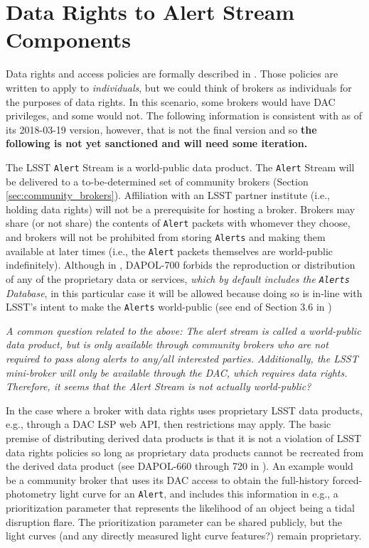 \section{Data Rights to Alert Stream Components}\label{sec:data_rights}



Data rights and access policies are formally described in .
Those policies are written to apply to {\em individuals}, but we could think of brokers as individuals for the purposes of data rights.
In this scenario, some brokers would have DAC privileges, and some would not.
The following information is consistent with  as of its 2018-03-19 version, however, that is not the final version and so {\bf the following is not yet sanctioned and will need some iteration.}

The LSST {\tt Alert} Stream is a world-public data product.
The {\tt Alert} Stream will be delivered to a to-be-determined set of community brokers (Section \ref{sec:community_brokers}).
Affiliation with an LSST partner institute (i.e., holding data rights) will not be a prerequisite for hosting a broker.
Brokers may share (or not share) the contents of {\tt Alert} packets with whomever they choose, and brokers will not be prohibited from storing {\tt Alerts} and making them available at later times (i.e., the {\tt Alert} packets themselves are world-public indefinitely).
Although in , DAPOL-700 forbids the reproduction or distribution of any of the proprietary data or services, {\em which by default includes the {\tt Alerts} Database}, in this particular case it will be allowed because doing so is in-line with LSST's intent to make the {\tt Alerts} world-public (see end of Section 3.6 in )

{\it A common question related to the above: The alert stream is called a world-public data product, but is only available through community brokers who are not required to pass along alerts to any/all interested parties.
Additionally, the LSST mini-broker will only be available through the DAC, which requires data rights.
Therefore, it seems that the Alert Stream is not actually world-public?}

In the case where a broker with data rights uses proprietary LSST data products, e.g., through a DAC LSP web API, then restrictions may apply.
The basic premise of distributing derived data products is that it is not a violation of LSST data rights policies so long as proprietary data products cannot be recreated from the derived data product (see DAPOL-660 through 720 in ).
An example would be a community broker that uses its DAC access to obtain the full-history forced-photometry light curve for an {\tt Alert}, and includes this information in e.g., a prioritization parameter that represents the likelihood of an object being a tidal disruption flare.
The prioritization parameter can be shared publicly, but the light curves (and any directly measured light curve features?) remain proprietary.

